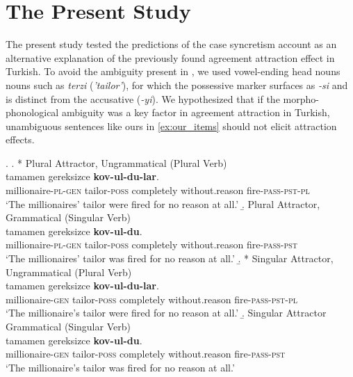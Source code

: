\documentclass[apacite,linguex]{glossa}\usepackage[]{graphicx}\usepackage[]{color}
\begin{document}
\section{The Present Study}

The present study tested the predictions of the case syncretism account as an alternative explanation of the previously found agreement attraction effect in Turkish. To avoid the ambiguity present in \citet{LagoEtAl:2019}, we used vowel-ending head nouns nouns such as \textit{terzi} (\textit{'tailor'}), for which the possessive marker surfaces as \textit{-si} and is distinct from the accusative (\textit{-yi}). We hypothesized that if the morpho-phonological ambiguity was a key factor in agreement attraction in Turkish, unambiguous sentences like ours in \ref{ex:our_items} should not elicit attraction effects.

\ex. \label{ex:our_items}
  \a. * Plural Attractor, Ungrammatical (Plural Verb) \label{ex:expitem-plpl}\\
   tamamen gereksizce \textbf{kov-ul-du-lar}.\\
  millionaire-\textsc{pl}-\textsc{gen} tailor-\textsc{poss} completely without.reason fire-\textsc{pass}-\textsc{pst}-\textsc{pl}\\
  \glt `The millionaires' tailor were fired for no reason at all.'
  \b. Plural Attractor, Grammatical (Singular Verb) \label{ex:expitem-plsg} \\
   tamamen gereksizce \textbf{kov-ul-du}.\\
  millionaire-\textsc{pl}-\textsc{gen} tailor-\textsc{poss} completely without.reason fire-\textsc{pass}-\textsc{pst}\\
  \glt `The millionaires' tailor was fired for no reason at all.'
  \b. * Singular Attractor, Ungrammatical (Plural Verb) \label{ex:expitem-sgpl}\\
   tamamen gereksizce \textbf{kov-ul-du-lar}.\\
  millionaire-\textsc{gen} tailor-\textsc{poss} completely without.reason fire-\textsc{pass}-\textsc{pst}-\textsc{pl}\\
  \glt `The millionaire's tailor were fired for no reason at all.'
  \b. Singular Attractor Grammatical (Singular Verb) \label{ex:expitem-sgsg}\\
   tamamen gereksizce \textbf{kov-ul-du}.\\
  millionaire-\textsc{gen} tailor-\textsc{poss} completely without.reason fire-\textsc{pass}-\textsc{pst}\\
  \glt `The millionaire's tailor was fired for no reason at all.'
  
\end{document}
